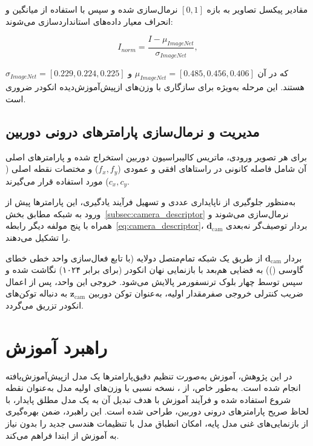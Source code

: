 مقادیر پیکسل تصاویر به بازه $[0,1]$ نرمال‌سازی شده و سپس با استفاده از میانگین و انحراف معیار داده‌های  استانداردسازی می‌شوند:

\begin{equation}
I_{norm} = \frac{I - \mu_{ImageNet}}{\sigma_{ImageNet}},
\end{equation}

که در آن $\mu_{ImageNet} = [0.485, 0.456, 0.406]$ و $\sigma_{ImageNet} = [0.229, 0.224, 0.225]$ هستند. این مرحله به‌ویژه برای سازگاری با وزن‌های ازپیش‌آموزش‌دیده انکودر  ضروری است.


\subsection{مدیریت و نرمال‌سازی پارامترهای درونی دوربین}

برای هر تصویر ورودی، ماتریس کالیبراسیون دوربین استخراج شده و پارامترهای اصلی آن شامل فاصله کانونی در راستاهای افقی و عمودی ($f_x, f_y$) و مختصات نقطه اصلی ($c_x, c_y$) مورد استفاده قرار می‌گیرند.

به‌منظور جلوگیری از ناپایداری عددی و تسهیل فرآیند یادگیری، این پارامترها پیش از ورود به شبکه مطابق بخش~\ref{subsec:camera_descriptor} نرمال‌سازی می‌شوند و همراه با پنج مولفه دیگر رابطه~\eqref{eq:camera_descriptor}، بردار توصیف‌گر نه‌بعدی $\mathbf{d}_{\mathrm{cam}}$ را تشکیل می‌دهند.

بردار $\mathbf{d}_{\mathrm{cam}}$ از طریق یک شبکه تمام‌متصل دولایه (با تابع فعال‌سازی واحد خطی خطای گاوسی ()) به فضایی هم‌بعد با بازنمایی نهان انکودر (برای  برابر ۱۰۲۴) نگاشت شده و سپس توسط چهار بلوک ترنسفورمر پالایش می‌شود. خروجی این واحد، پس از اعمال ضریب کنترلی خروجی صفرمقدار اولیه، به‌عنوان توکن دوربین $\mathbf{z}_{\mathrm{cam}}$ به دنباله توکن‌های انکودر تزریق می‌گردد.



 \section{راهبرد آموزش \proposedmodel{}}

در این پژوهش، آموزش \proposedmodel{} به‌صورت تنظیم دقیق‌پارامترها یک مدل ازپیش‌آموزش‌یافته انجام شده است. به‌طور خاص، از \basemodel{}، نسخه نسبی با وزن‌های اولیه مدل  به‌عنوان نقطه شروع استفاده شده و فرآیند آموزش با هدف تبدیل آن به یک مدل مطلق پایدار، با لحاظ صریح پارامترهای درونی دوربین، طراحی شده است. این راهبرد، ضمن بهره‌گیری از بازنمایی‌های غنی مدل پایه، امکان انطباق مدل با تنظیمات هندسی جدید را بدون نیاز به آموزش از ابتدا فراهم می‌کند.

